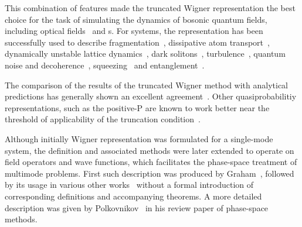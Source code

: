 This combination of features made the truncated Wigner representation the best choice for the task of simulating the dynamics of bosonic quantum fields, including optical fields~\cite{Drummond1993,Drummond1993a,Corney2008,Corney2006} and s.
For  systems, the representation has been successfully used to describe fragmentation~\cite{Isella2005,Isella2006,Gross2011}, dissipative atom transport~\cite{Ruostekoski2005}, dynamically unstable lattice dynamics~\cite{Shrestha2009}, dark solitons~\cite{Martin2010,Martin2010a}, turbulence~\cite{Norrie2005,Norrie2006}, quantum noise and decoherence~\cite{Steel1998,Norrie2006a,Egorov2011}, squeezing~\cite{Opanchuk2012} and entanglement~\cite{Opanchuk2012a}.

The comparison of the results of the truncated Wigner method with analytical predictions has generally shown an excellent agreement~\cite{Corney2006,Deuar2007}.
Other quasiprobabilitiy representations, such as the positive-P are known to work better near the threshold of applicability of the truncation condition~\cite{Deuar2007}.

Although initially Wigner representation was formulated for a single-mode system, the definition and associated methods were later extended to operate on field operators and wave functions,
which facilitates the phase-space treatment of multimode problems.
First such description was produced by Graham~\cite{Graham1970,Graham1970a}, followed by its usage in various other works~\cite{Steel1998,Gardiner2003,Isella2006,Norrie2006,Norrie2006a,Blakie2008,Martin2010} without a formal introduction of corresponding definitions and accompanying theorems.
A more detailed description was given by Polkovnikov~\cite{Polkovnikov2010} in his review paper of phase-space methods.

